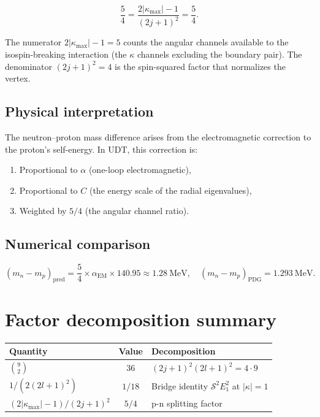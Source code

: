 \documentclass[11pt,letterpaper]{article}
\numberwithin{equation}{section}
\begin{document}
\begin{equation}
\label{eq:54_decomp}
  \frac{5}{4} = \frac{2|\kappa_\mathrm{max}|-1}{(2j+1)^2} = \frac{5}{4}.
\end{equation}

The numerator $2|\kappa_\mathrm{max}| - 1 = 5$ counts the angular channels
available to the isospin-breaking interaction (the $\kappa$ channels
excluding the boundary pair). The denominator $(2j+1)^2 = 4$ is the
spin-squared factor that normalizes the vertex.

\subsection{Physical interpretation}

The neutron--proton mass difference arises from the electromagnetic
correction to the proton's self-energy. In UDT, this correction is:
\begin{enumerate}
  \item Proportional to $\alpha$ (one-loop electromagnetic),
  \item Proportional to $C$ (the energy scale of the radial eigenvalues),
  \item Weighted by $5/4$ (the angular channel ratio).
\end{enumerate}

\subsection{Numerical comparison}

\begin{equation}
  (m_n - m_p)_\mathrm{pred} = \frac{5}{4} \times \alpha_\mathrm{EM} \times 140.95
  \approx 1.28~\mathrm{MeV},
  \quad (m_n - m_p)_\mathrm{PDG} = 1.293~\mathrm{MeV}.
\end{equation}

\section{Factor decomposition summary}
\label{sec:summary}

\begin{center}
\begin{tabular}{lcl}
\toprule
Quantity & Value & Decomposition \\
\midrule
$\binom{9}{2}$ & 36 & $(2j+1)^2(2l+1)^2 = 4 \cdot 9$ \\
$1/(2(2l+1)^2)$ & $1/18$ & Bridge identity $\mathcal{S}^2 E_1^2$ at $|\kappa|=1$ \\
$(2|\kappa_\mathrm{max}|-1)/(2j+1)^2$ & $5/4$ & p-n splitting factor \\
\bottomrule
\end{tabular}
\end{center}
\end{document}
